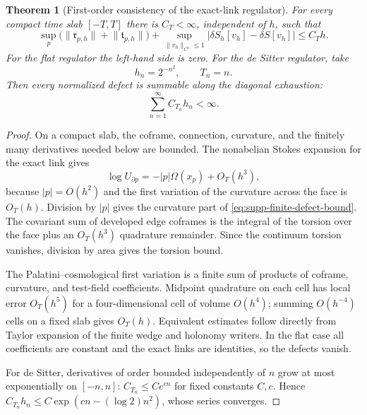\documentclass[11pt]{article}
\newtheorem{theorem}{Theorem}[section]
\theoremstyle{definition}
\theoremstyle{remark}
\newcommand{\norm}[1]{\lVert#1\rVert}
\newcommand{\abs}[1]{\lvert#1\rvert}
\begin{document}
\begin{theorem}[First-order consistency of the exact-link regulator]
\label{thm:supp-finite-defects}
For every compact time slab $[-T,T]$ there is $C_T<\infty$, independent of
$h$, such that
\begin{equation}
 \sup_p\bigl(\norm{\mathfrak r_{p,h}}+
\norm{\mathfrak t_{p,h}}\bigr)
 +\sup_{\norm{v_h}_{C^1}\le1}
  \abs{\delta S_h[v_h]-\delta S[v_h]}
 \le C_Th.
 \label{eq:supp-finite-defect-bound}
\end{equation}
For the flat regulator the left-hand side is zero.  For the de Sitter
regulator, take
\begin{equation}
 h_n=2^{-n^2},
 \qquad
 T_n=n.
 \label{eq:supp-diagonal-exhaustion}
\end{equation}
Then every normalized defect is summable along the diagonal exhaustion:
\begin{equation}
 \sum_{n=1}^{\infty}C_{T_n}h_n<\infty.
 \label{eq:supp-defect-summability}
\end{equation}
\end{theorem}

\begin{proof}
On a compact slab, the coframe, connection, curvature, and the finitely many
derivatives needed below are bounded.  The nonabelian Stokes expansion for the
exact link gives
\[
 \log U_{\partial p}
 =-|p|\Omega(x_p)+O_T(h^3),
\]
because $|p|=O(h^2)$ and the first variation of the curvature across the face
is $O_T(h)$.  Division by $|p|$ gives the curvature part of
\eqref{eq:supp-finite-defect-bound}.  The covariant sum of developed edge
coframes is the integral of the torsion over the face plus an $O_T(h^3)$
quadrature remainder.  Since the continuum torsion vanishes, division by area
gives the torsion bound.

The Palatini--cosmological first variation is a finite sum of products of
coframe, curvature, and test-field coefficients.  Midpoint quadrature on each
cell has local error $O_T(h^5)$ for a four-dimensional cell of volume
$O(h^4)$; summing $O(h^{-4})$ cells on a fixed slab gives $O_T(h)$.
Equivalent estimates follow directly from Taylor expansion of the finite
wedge and holonomy writers.  In the flat case all coefficients are constant
and the exact links are identities, so the defects vanish.

For de Sitter, derivatives of order bounded independently of $n$ grow at most
exponentially on $[-n,n]$: $C_{T_n}\le C e^{cn}$ for fixed constants $C,c$.
Hence
$C_{T_n}h_n\le C\exp(cn-(\log2)n^2)$, whose series converges.
\end{proof}
\end{document}
